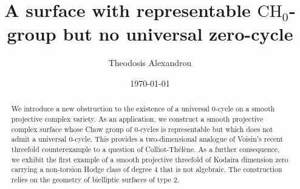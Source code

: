 \documentclass[11pt,letterpaper]{amsart}
\numberwithin{equation}{section}
\theoremstyle{definition}
\theoremstyle{remark}
\newcommand{\Ch}{\operatorname{CH_{0}}}
\begin{document}
\title[A surface with representable $\Ch$ but no universal zero-cycle]{A surface with representable $\Ch$-group but no universal zero-cycle}

\author{Theodosis Alexandrou} 
\address{Institut für Mathematik, Humboldt-Universität zu Berlin, Rudower Chaussee 25, 10099 Berlin, Deutschland.}



\date{\today} 



\begin{abstract}
We introduce a new obstruction to the existence of a universal $0$-cycle on a smooth projective complex variety. As an application, we construct a smooth projective complex surface whose Chow group of $0$-cycles is representable but which does not admit a universal $0$-cycle. This provides a two-dimensional analogue of Voisin’s recent threefold counterexample to a question of Colliot-Thélène. As a further consequence, we exhibit the first example of a smooth projective threefold of Kodaira dimension zero carrying a non-torsion Hodge class of degree $4$ that is not algebraic. The construction relies on the geometry of bielliptic surfaces of type $2$.
\end{abstract}

\maketitle
\end{document}
